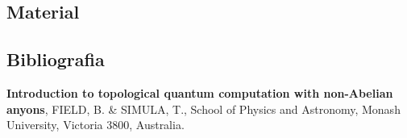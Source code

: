 \documentclass[t]{beamer}
\begin{document}
	\subsection{Material}
	
	\begin{frame}{\subsecname}
	
	\end{frame}
	
	\subsection{Bibliografia}
	
	\begin{frame}{\subsecname}
		
		 \textbf{Introduction to topological quantum computation with non-Abelian anyons}, FIELD, B. \& SIMULA, T., School of Physics and Astronomy, Monash University, Victoria 3800, Australia.
		
		\bibitem{}
	\end{frame}
\end{document}

